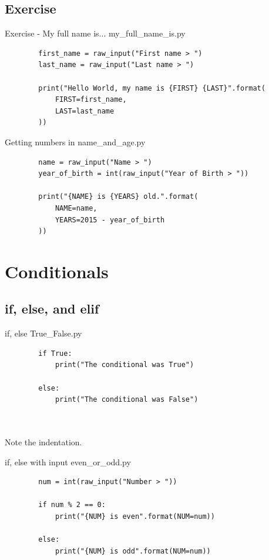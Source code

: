 \documentclass[11pt]{beamer}
\newcommand{\emptyline}{$ $\\}
\begin{document}
\subsection{Exercise}
\begin{frame}[fragile]{Exercise - My full name is...}
	\pause
	my\_full\_name\_is.py
	\begin{lstlisting}
		first_name = raw_input("First name > ")
		last_name = raw_input("Last name > ")

		print("Hello World, my name is {FIRST} {LAST}".format(
		    FIRST=first_name,
		    LAST=last_name
		))
	\end{lstlisting}
\end{frame}

\begin{frame}[fragile]{Getting numbers in}
	name\_and\_age.py
	\begin{lstlisting}
		name = raw_input("Name > ")
		year_of_birth = int(raw_input("Year of Birth > "))

		print("{NAME} is {YEARS} old.".format(
		    NAME=name,
		    YEARS=2015 - year_of_birth
		))
	\end{lstlisting}
\end{frame}

\section{Conditionals}
\subsection{if, else, and elif}
\begin{frame}[fragile]{if, else}
	True\_False.py
	\begin{lstlisting}
		if True:
		    print("The conditional was True")

		else:
		    print("The conditional was False")
	\end{lstlisting}
	\emptyline
	\emptyline
	\pause
	Note the indentation.
\end{frame}

\begin{frame}[fragile]{if, else with input}
	even\_or\_odd.py
	\begin{lstlisting}
		num = int(raw_input("Number > "))

		if num % 2 == 0:
		    print("{NUM} is even".format(NUM=num))

		else:
		    print("{NUM} is odd".format(NUM=num))
	\end{lstlisting}
\end{frame}
\end{document}
